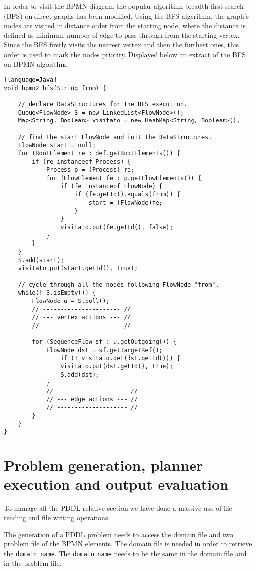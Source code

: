 In order to visit the BPMN diagram the popular algorithm breadth-first-search (BFS) on direct graphs has been modified.
Using the BFS algorithm, the graph's nodes are visited in distance order from the starting node, where the distance is defined as minimum number of edge to pass through from the starting vertex. Since the BFS firstly visits the nearest vertex and then the furthest ones, this order is used to mark the nodes priority. 
Displayed below an extract of the BFS on BPMN algorithm.

\begin{lstlisting}[caption=BFS on Business Process Diagram.][language=Java]
void bpmn2_bfs(String from) {

	// declare DataStructures for the BFS execution.
	Queue<FlowNode> S = new LinkedList<FlowNode>();
	Map<String, Boolean> visitato = new HashMap<String, Boolean>();

	// find the start FlowNode and init the DataStructures.
	FlowNode start = null;
	for (RootElement re : def.getRootElements()) {
		if (re instanceof Process) {
			Process p = (Process) re;
			for (FlowElement fe : p.getFlowElements()) {
				if (fe instanceof FlowNode) {
					if (fe.getId().equals(from)) {
						start = (FlowNode)fe;
					}
				}
				visitato.put(fe.getId(), false);
			}
		}
	}
	S.add(start);
	visitato.put(start.getId(), true);

	// cycle through all the nodes following FlowNode "from".
	while(! S.isEmpty()) {
		FlowNode u = S.poll();		
		// ---------------------- //
		// --- vertex actions --- //
		// ---------------------- //

		for (SequenceFlow sf : u.getOutgoing()) {
			FlowNode dst = sf.getTargetRef();
				if (! visitato.get(dst.getId())) {
				visitato.put(dst.getId(), true);
				S.add(dst);
			}
			// -------------------- //
			// --- edge actions --- //
			// -------------------- //
		}
	}
}
\end{lstlisting}


\section{Problem generation, planner execution and output evaluation}
\label{sec:456}

To manage all the PDDL relative section we have done a massive use of file reading and file writing operations.

The generation of a PDDL problem needs to access the domain file and two problem file of the BPMN elements.
The domain file is needed in order to retrieve the \texttt{domain name}.
The \texttt{domain name} needs to be the same in the domain file and in the problem file.


